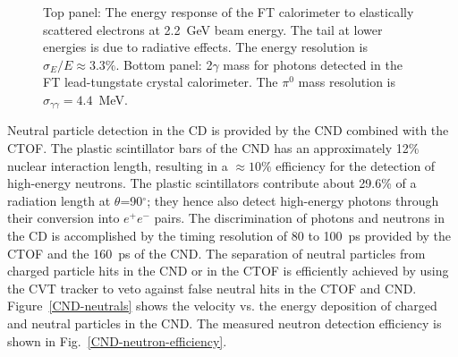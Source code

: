 \documentclass[final,3p,twocolumn]{elsarticle}
\begin{document}
\begin{figure}[tp!]
\caption{Top panel: The energy response of the FT calorimeter to elastically scattered electrons at 2.2~GeV
  beam energy. The tail at lower energies is due to radiative effects. The energy resolution is
  $\sigma_E / E \approx 3.3\%$. Bottom panel: 2$\gamma$ mass for photons detected in the FT lead-tungstate
  crystal calorimeter. The $\pi^0$ mass resolution is $\sigma_{\gamma\gamma} = 4.4$~MeV.}
\label{FT-en-gg}
\end{figure}

Neutral particle detection in the CD is provided by the CND combined with the CTOF. The plastic scintillator bars
of the CND has an approximately 12\% nuclear interaction length, resulting in a $\approx 10\%$ efficiency for
the detection of high-energy neutrons. The plastic scintillators contribute about 29.6\% of a radiation length at
$\theta$=90$^\circ$; they hence also detect high-energy photons through their conversion into $e^+e^-$ pairs. The
discrimination of photons and neutrons in the CD is accomplished by the timing resolution of 80 to 100~ps provided by the
CTOF and the 160~ps of the CND. The separation of neutral particles from charged particle hits in the CND or in
the CTOF is efficiently achieved by using the CVT tracker to veto against false neutral hits in the CTOF and CND.
Figure~\ref{CND-neutrals} shows the velocity vs. the energy deposition of charged and neutral particles in the
CND. The measured neutron detection efficiency is shown in Fig.~\ref{CND-neutron-efficiency}.
\end{document}
